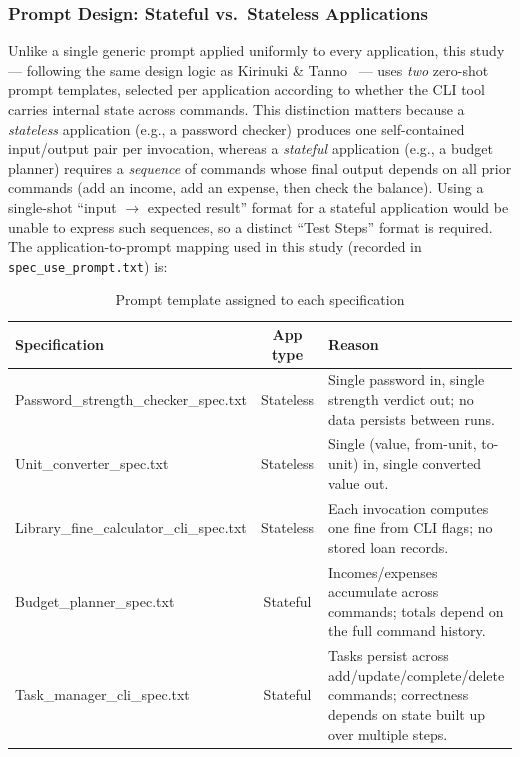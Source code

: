 \documentclass[12pt,a4paper]{article}
\begin{document}
\subsubsection*{Prompt Design: Stateful vs.\ Stateless Applications}
Unlike a single generic prompt applied uniformly to every application, this study --- following the same design logic as Kirinuki \& Tanno~\cite{b1} --- uses \emph{two} zero-shot prompt templates, selected per application according to whether the CLI tool carries internal state across commands. This distinction matters because a \emph{stateless} application (e.g., a password checker) produces one self-contained input/output pair per invocation, whereas a \emph{stateful} application (e.g., a budget planner) requires a \emph{sequence} of commands whose final output depends on all prior commands (add an income, add an expense, then check the balance). Using a single-shot ``input $\rightarrow$ expected result'' format for a stateful application would be unable to express such sequences, so a distinct ``Test Steps'' format is required. The application-to-prompt mapping used in this study (recorded in \texttt{spec\_use\_prompt.txt}) is:

\begin{table}[H]
\centering
\caption{Prompt template assigned to each specification}
\label{tab:prompt-mapping}
\begin{tabularx}{\textwidth}{lcY}
\toprule
\textbf{Specification} & \textbf{App type} & \textbf{Reason} \\
\midrule
Password\_strength\_checker\_spec.txt & Stateless & Single password in, single strength verdict out; no data persists between runs. \\
Unit\_converter\_spec.txt & Stateless & Single (value, from-unit, to-unit) in, single converted value out. \\
Library\_fine\_calculator\_cli\_spec.txt & Stateless & Each invocation computes one fine from CLI flags; no stored loan records. \\
Budget\_planner\_spec.txt & Stateful & Incomes/expenses accumulate across commands; totals depend on the full command history. \\
Task\_manager\_cli\_spec.txt & Stateful & Tasks persist across add/update/complete/delete commands; correctness depends on state built up over multiple steps. \\
\bottomrule
\end{tabularx}
\end{table}
\end{document}
